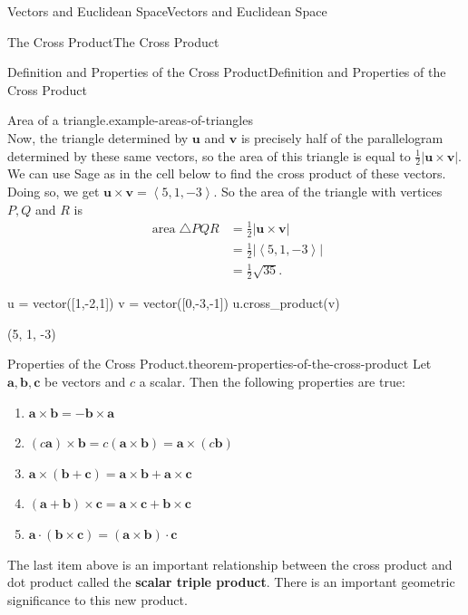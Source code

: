 \documentclass[10pt,]{book}
\newcommand{\terminology}[1]{\textbf{#1}}
\numberwithin{equation}{section}
\newcommand{\vv}[1]{\mathbf{#1}}
\newcommand{\dotprod}[1]{\left\langle #1 \right\rangle}
\begin{document}
\begin{chapterptx}{Vectors and Euclidean Space}{}{Vectors and Euclidean Space}{}{}
\begin{sectionptx}{The Cross Product}{}{The Cross Product}{}{}
\begin{subsectionptx}{Definition and Properties of the Cross Product}{}{Definition and Properties of the Cross Product}{}{}
\begin{example}{Area of a triangle.}{example-areas-of-triangles}
\begin{equation*}
\end{equation*}
\hypertarget{p-966}{}%
Now, the triangle determined by \(\vv{u}\) and \(\vv{v}\) is precisely half of the parallelogram determined by these same vectors, so the area of this triangle is equal to \(\frac{1}{2}|\vv{u}\times\vv{v}|\). We can use Sage as in the cell below to find the cross product of these vectors. Doing so, we get \(\vv{u}\times\vv{v} = \dotprod{5,1,-3}.\) So the area of the triangle with vertices \(P,Q\) and \(R\) is%
%
\begin{align*}
\operatorname{area} \triangle PQR & = \frac{1}{2}|\vv{u}\times\vv{v}| \\
& = \frac{1}{2}|\dotprod{5,1,-3}| \\
& = \frac{1}{2}\sqrt{35}. 
\end{align*}
\end{example}
\begin{sageinput}
u = vector([1,-2,1])
v = vector([0,-3,-1])
u.cross_product(v)
\end{sageinput}
\begin{sageoutput}
(5, 1, -3)
\end{sageoutput}
\begin{theorem}{Properties of the Cross Product.}{}{theorem-properties-of-the-cross-product}%
\hypertarget{p-967}{}%
Let \(\vv{a},\vv{b},\vv{c}\) be vectors and \(c\) a scalar. Then the following properties are true:%
\leavevmode%
\begin{multicols}{2}
\begin{enumerate}
\item\hypertarget{li-81}{}\(\vv{a}\times\vv{b} = -\vv{b}\times\vv{a}\)%
\item\hypertarget{li-82}{}\((c\vv{a})\times\vv{b} = c(\vv{a}\times\vv{b}) = \vv{a}\times(c\vv{b})\)%
\item\hypertarget{li-83}{}\(\vv{a}\times(\vv{b}+\vv{c}) = \vv{a}\times\vv{b}+\vv{a}\times\vv{c}\)%
\item\hypertarget{li-84}{}\((\vv{a}+\vv{b})\times\vv{c} = \vv{a}\times\vv{c}+\vv{b}\times\vv{c}\)%
\item\hypertarget{li-85}{}\(\vv{a}\cdot(\vv{b}\times\vv{c}) = (\vv{a}\times\vv{b})\cdot\vv{c}\)%
\end{enumerate}
\end{multicols}
\end{theorem}
\hypertarget{p-968}{}%
The last item above is an important relationship between the cross product and dot product called the \terminology{scalar triple product}. There is an important geometric significance to this new product.%

\end{subsectionptx}
\end{sectionptx}
\end{chapterptx}
\end{document}
